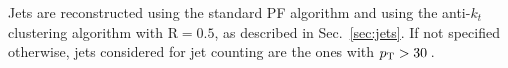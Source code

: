 Jets are reconstructed using the standard PF algorithm and using the anti-$k_t$ clustering algorithm with $\mathrm{R} = 0.5$, as described in Sec.~\ref{sec:jets}. If not specified otherwise, jets considered for jet counting are the ones with $p_\mathrm{T} > 30$\,\GeV.

